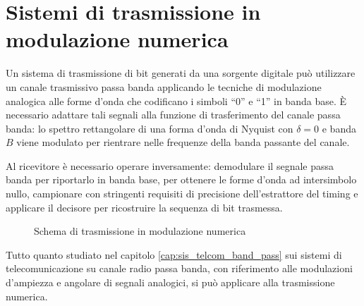 \chapter{Sistemi di trasmissione in modulazione numerica}
Un sistema di trasmissione di bit generati da una sorgente digitale può utilizzare un canale trasmissivo passa banda applicando le tecniche di modulazione analogica alle forme d'onda che codificano i simboli “0” e “1” in banda base. \`{E} necessario adattare tali segnali alla funzione di trasferimento del canale passa banda: lo spettro rettangolare di una forma d'onda di Nyquist con $\delta=0$ e banda $B$ viene modulato per rientrare nelle frequenze della banda passante del canale.

Al ricevitore è necessario operare inversamente: demodulare il segnale passa banda per riportarlo in banda base, per ottenere le forme d'onda ad intersimbolo nullo, campionare con stringenti requisiti di precisione dell'estrattore del timing e applicare il decisore per ricostruire la sequenza di bit trasmessa. 

\begin{figure}[!ht]
	\centering
	\caption{Schema di trasmissione in modulazione numerica}
\end{figure}

Tutto quanto studiato nel capitolo \ref{cap:sis_telcom_band_pass} sui sistemi di telecomunicazione su canale radio passa banda, con riferimento alle modulazioni d'ampiezza e angolare di segnali analogici, si può applicare alla trasmissione numerica.


